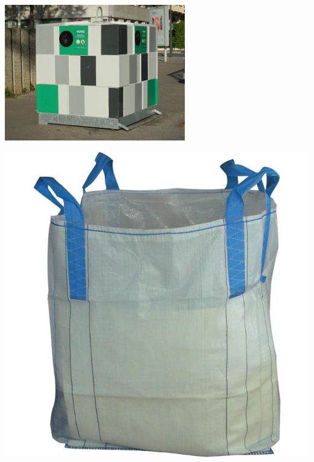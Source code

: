 \documentclass[hidelinks, paper=a4, fontsize=13pt]{report}
\begin{document}
\begin{center}
	\includegraphics[width=.5\textwidth,keepaspectratio]{Annexes/Images/silo_verre}
\end{center}

\begin{center}
	\includegraphics[width=.4\textwidth,keepaspectratio]{Annexes/Images/sac_gravat}
\end{center}
\end{document}
